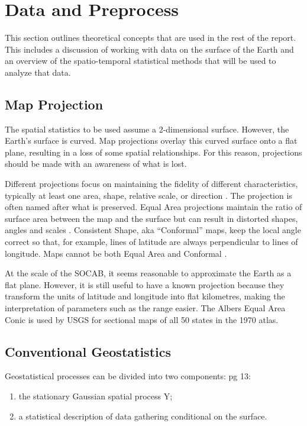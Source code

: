 \section{Data and Preprocess}
\label{sec:theory}
This section outlines theoretical concepts that are used in the rest of the report. This includes a discussion of working with data on the surface of the Earth and an overview of the spatio-temporal statistical methods that will be used to analyze that data.

\subsection{Map Projection} \label{subsec:MapProjection}
The spatial statistics to be used assume a 2-dimensional surface. However, the Earth's surface is curved.  Map projections overlay this curved surface onto a flat plane, resulting in a loss of some spatial relationships.  For this reason, projections should be made with an awareness of what is lost.  

Different projections focus on maintaining the fidelity of different characteristics, typically at least one area, shape, relative scale, or direction \citep{USGS:MapProjections}.  The projection is often named after what is preserved.  Equal Area projections maintain the ratio of surface area between the map and the surface but can result in distorted shapes, angles and scales \citep{USGS:MapProjections}.  Consistent Shape,  aka ``Conformal'' maps, keep the local angle correct so that, for example, lines of latitude are always perpendicular to lines of longitude.  Maps cannot be both Equal Area and Conformal  \citep{USGS:MapProjections}.

At the scale of the \ac{SOCAB}, it seems reasonable to approximate the Earth as a flat plane.  However, it is still useful to have a known projection because they transform the units of latitude and longitude into flat kilometres, making the interpretation of parameters such as the range easier.  The Albers Equal Area Conic is used by \ac{USGS} for sectional maps of all 50 states in the 1970 atlas.







\subsection{Conventional Geostatistics}
\label{subsec:convgeostats}

Geostatistical processes can be divided into two components: 
\citep{diggle:07} pg 13: 
\begin{enumerate}
	\item the stationary Gaussian spatial process \gls{Y};
	\item a statistical description of data gathering conditional on the surface.
\end{enumerate}

